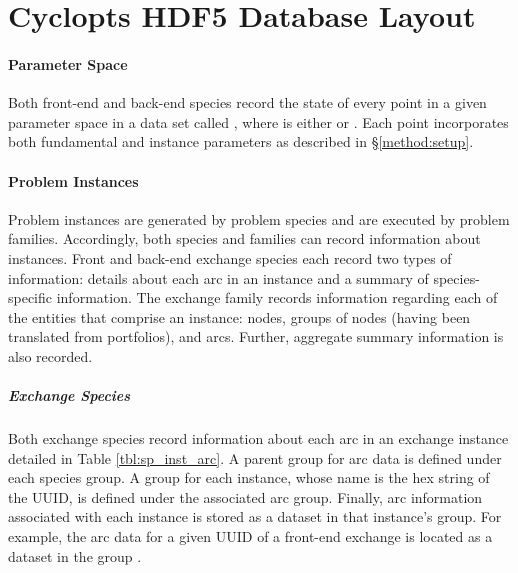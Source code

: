 \chapter{Cyclopts HDF5 Database Layout}\label{app:hdf5}


\subsubsection{Parameter Space}

Both front-end and back-end species record the state of every point in a given
parameter space in a data set called ,
where  is either  or
. Each point incorporates both fundamental and instance
parameters as described in \S \ref{method:setup}. 

\subsubsection{Problem Instances}

Problem instances are generated by problem species and are executed by problem
families. Accordingly, both species and families can record information about
instances. Front and back-end exchange species each record two types of
information: details about each arc in an instance and a summary of
species-specific information. The exchange family records information regarding
each of the entities that comprise an instance: nodes, groups of nodes (having
been translated from portfolios), and arcs. Further, aggregate summary
information is also recorded. 

\paragraph{Exchange Species}

Both exchange species record information about each arc in an exchange instance
detailed in Table \ref{tbl:sp_inst_arc}. A parent group for arc data is defined
under each species group. A group for each instance, whose name is the hex
string of the UUID, is defined under the associated arc group. Finally, arc
information associated with each instance is stored as a dataset in that
instance's group. For example, the arc data for a given UUID of a front-end
exchange is located as a dataset in the group
.

